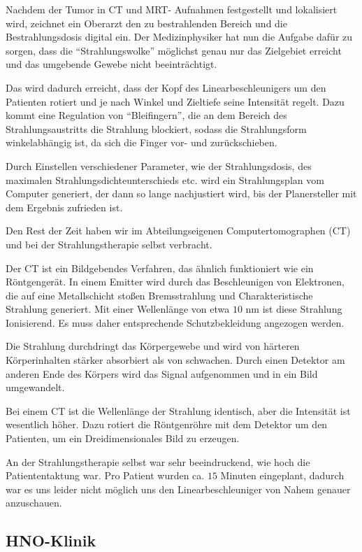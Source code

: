 \documentclass[11pt,a4paper,titlepage]{scrartcl}
\begin{document}
Nachdem der Tumor in CT und MRT- Aufnahmen festgestellt und lokalisiert wird, zeichnet ein Oberarzt den zu bestrahlenden Bereich und die Bestrahlungsdosis digital ein. Der Medizinphysiker hat nun die Aufgabe dafür zu sorgen, dass die \enquote{Strahlungswolke} möglichst genau nur das Zielgebiet erreicht und das umgebende Gewebe nicht beeinträchtigt. \medskip

Das wird dadurch erreicht, dass der Kopf des Linearbeschleunigers um den Patienten rotiert und je nach Winkel und Zieltiefe seine Intensität regelt. Dazu kommt eine Regulation von \enquote{Bleifingern}, die an dem Bereich des Strahlungsaustritts die Strahlung blockiert, sodass die Strahlungsform winkelabhängig ist, da sich die Finger vor- und zurückschieben. \medskip

Durch Einstellen verschiedener Parameter, wie der Strahlungsdosis, des maximalen Strahlungsdichteunterschieds etc. wird ein Strahlungsplan vom Computer generiert, der dann so lange nachjustiert wird, bis der Planersteller mit dem Ergebnis zufrieden ist. \medskip

Den Rest der Zeit haben wir im Abteilungseigenen Computertomographen (CT) und bei der Strahlungstherapie selbst verbracht. \medskip

Der CT ist ein Bildgebendes Verfahren, das ähnlich funktioniert wie ein Röntgengerät. In einem Emitter wird durch das Beschleunigen von Elektronen, die auf eine Metallschicht stoßen Bremsstrahlung und Charakteristische Strahlung generiert. Mit einer Wellenlänge von etwa $10$ nm ist diese Strahlung Ionisierend. Es muss daher entsprechende Schutzbekleidung angezogen werden. \medskip

Die Strahlung durchdringt das Körpergewebe und wird von härteren Körperinhalten stärker absorbiert als von schwachen. Durch einen Detektor am anderen Ende des Körpers wird das Signal aufgenommen und in ein Bild umgewandelt. \medskip

Bei einem CT ist die Wellenlänge der Strahlung identisch, aber die Intensität ist wesentlich höher. Dazu rotiert die Röntgenröhre mit dem Detektor um den Patienten, um ein Dreidimensionales Bild zu erzeugen. \medskip

An der Strahlungstherapie selbst war sehr beeindruckend, wie hoch die Patiententaktung war. Pro Patient wurden ca. $15$ Minuten eingeplant, dadurch war es uns leider nicht möglich uns den Linearbeschleuniger von Nahem genauer anzuschauen. \medskip 

\subsection{HNO-Klinik}
\end{document}
